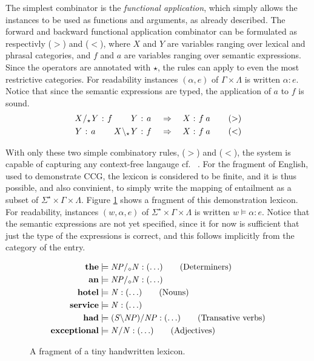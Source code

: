 The simplest combinator is the \emph{functional application}, which simply allows the instances to be used as functions and arguments, as already described. The forward and backward functional application combinator can be formulated as respectivly ($>$) and ($<$), where $X$ and $Y$ are variables ranging over lexical and phrasal categories, and $f$ and $a$ are variables ranging over semantic expressions. Since the operators are annotated with $\star$, the rules can apply to even the most restrictive categories. For readability instances $(\alpha, e)$ of $\Gamma \times \Lambda$ is written $\alpha : e$. Notice that since the semantic expressions are typed, the application of $a$ to $f$ is sound. 
\begin{align*}
  \catvar{X}/_\star \catvar{Y} : \fvar{f}  \quad\quad                  \catvar{Y} : \fvar{a} 
  &\quad\Rightarrow\quad
  \catvar{X} : \fvar{f} \fvar{a} 
  \tag{$>$} \\
  \catvar{Y}            : \fvar{a}  \quad\quad  \catvar{X} \bsl_\star \catvar{Y} : \fvar{f}
  &\quad\Rightarrow\quad
  \catvar{X} : \fvar{f} \fvar{a}
  \tag{$<$}
\end{align*}

With only these two simple combinatory rules, ($>$) and ($<$), the system is capable of capturing any context-free langauge cf.\ \citeauthor{sp} . For the fragment of English, used to demonstrate CCG, the lexicon is considered to be finite, and it is thus possible, and also convinient, to simply write the mapping of entailment as a subset of $\Sigma^\star \times \Gamma \times \Lambda$. Figure \ref{fig:TinyLex} shows a fragment of this demonstration lexicon. For readability, instances $(w, \alpha, e)$ of $\Sigma^\star \times \Gamma \times \Lambda$ is written $w \models \alpha : e$. Notice that the semantic expressions are not yet specified, since it for now is sufficient that just the type of the expressions is correct, and this follows implicitly from the category of the entry.
\begin{figure}[ht]
\vspace{-.5em}
\begin{align*}
  \mathbf{the}       &\models {\mathit{NP}} /_\diamond {\mathit{N}}    : (\ldots)    \tag{Determiners} \\
  \mathbf{an}        &\models {\mathit{NP}} /_\diamond {\mathit{N}}    : (\ldots)    \\
  \mathbf{hotel}     &\models {\mathit{N}}               : (\ldots)                 \tag{Nouns} \\
  \mathbf{service}   &\models {\mathit{N}}               : (\ldots)                 \\
  \mathbf{had}       &\models ({\mathit{S}} \backslash {\mathit{NP}})/{\mathit{NP}}
                                                  : (\ldots)               \tag{Transative verbs} \\
  \mathbf{exceptional}   &\models {\mathit{N/N}}         : (\ldots)                 \tag{Adjectives}  
\end{align*}
\vspace{-1em}
\caption{A fragment of a tiny handwritten lexicon.}
\label{fig:TinyLex}
\end{figure}

